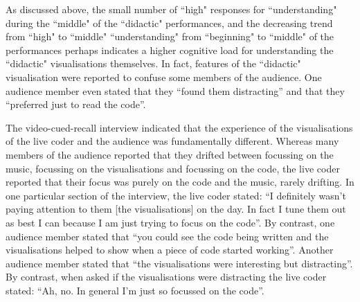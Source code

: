\documentclass{sig-alternate}
\begin{document}


 As discussed above, the small number of ``high" responses for ``understanding" during the ``middle" of the ``didactic" performances, and the decreasing trend from ``high" to ``middle" ``understanding" from ``beginning" to ``middle" of the performances perhaps indicates a higher cognitive load for understanding the ``didactic" visualisations themselves. In fact, features of the ``didactic" visualisation were reported to confuse some members of the audience. One audience member even stated that they ``found them distracting'' and that they ``preferred just to read the code''.


The video-cued-recall interview indicated that the experience of the visualisations of the live coder and the  audience was fundamentally different. Whereas many members of the audience reported that they drifted between focussing on the music, focussing on the visualisations and focussing on the code, the live coder reported that their focus was  purely on the code and the music, rarely drifting. In one particular section of the interview, the live coder stated: ``I definitely wasn't paying attention to them [the visualisations] on the day. In fact I tune them out as best I can because I am just trying to focus on the code''. By contrast, one audience member stated that ``you could see the code being written and the visualisations helped to show when a piece of code started working''. Another audience member stated that ``the visualisations were interesting but distracting''. By contrast, when asked if the visualisations were distracting the live coder stated: ``Ah, no. In general I'm just so focussed on the code''. 
\end{document}
